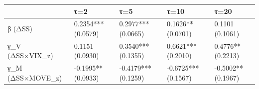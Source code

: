\begin{tabular}{lllll}
\toprule
 & τ=2 & τ=5 & τ=10 & τ=20 \\
\midrule
β (ΔSS) & 0.2354***
(0.0579) & 0.2977***
(0.0665) & 0.1626**
(0.0701) & 0.1101
(0.1061) \\
γ_V (ΔSS×VIX_z) & 0.1151
(0.0930) & 0.3540***
(0.1355) & 0.6621***
(0.2010) & 0.4776**
(0.2213) \\
γ_M (ΔSS×MOVE_z) & -0.1995**
(0.0933) & -0.4179***
(0.1259) & -0.6725***
(0.1567) & -0.5002**
(0.1967) \\
\bottomrule
\end{tabular}
